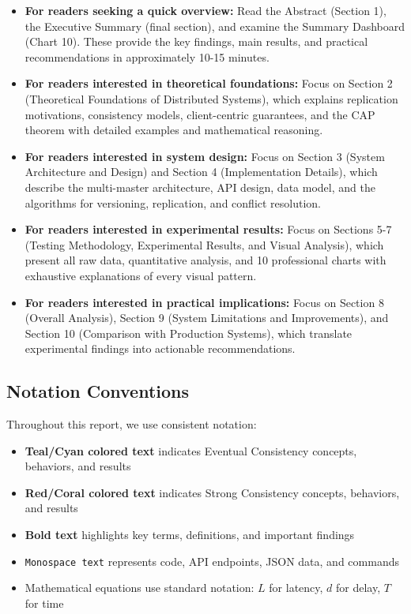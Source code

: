 \documentclass[10pt,a4paper]{article}
\newcommand{\eventual}[1]{\textcolor{eventualcolor}{\textbf{#1}}}
\newcommand{\strongcon}[1]{\textcolor{strongcolor}{\textbf{#1}}}
\begin{document}
\begin{itemize}
    \item \textbf{For readers seeking a quick overview:} Read the Abstract (Section 1), the Executive Summary (final section), and examine the Summary Dashboard (Chart 10). These provide the key findings, main results, and practical recommendations in approximately 10-15 minutes.
    
    \item \textbf{For readers interested in theoretical foundations:} Focus on Section 2 (Theoretical Foundations of Distributed Systems), which explains replication motivations, consistency models, client-centric guarantees, and the CAP theorem with detailed examples and mathematical reasoning.
    
    \item \textbf{For readers interested in system design:} Focus on Section 3 (System Architecture and Design) and Section 4 (Implementation Details), which describe the multi-master architecture, API design, data model, and the algorithms for versioning, replication, and conflict resolution.
    
    \item \textbf{For readers interested in experimental results:} Focus on Sections 5-7 (Testing Methodology, Experimental Results, and Visual Analysis), which present all raw data, quantitative analysis, and 10 professional charts with exhaustive explanations of every visual pattern.
    
    \item \textbf{For readers interested in practical implications:} Focus on Section 8 (Overall Analysis), Section 9 (System Limitations and Improvements), and Section 10 (Comparison with Production Systems), which translate experimental findings into actionable recommendations.
\end{itemize}

\subsection{Notation Conventions}

Throughout this report, we use consistent notation:

\begin{itemize}
    \item \eventual{Teal/Cyan colored text} indicates Eventual Consistency concepts, behaviors, and results
    \item \strongcon{Red/Coral colored text} indicates Strong Consistency concepts, behaviors, and results
    \item \textbf{Bold text} highlights key terms, definitions, and important findings
    \item \texttt{Monospace text} represents code, API endpoints, JSON data, and commands
    \item Mathematical equations use standard notation: $L$ for latency, $d$ for delay, $T$ for time
\end{itemize}
\end{document}
